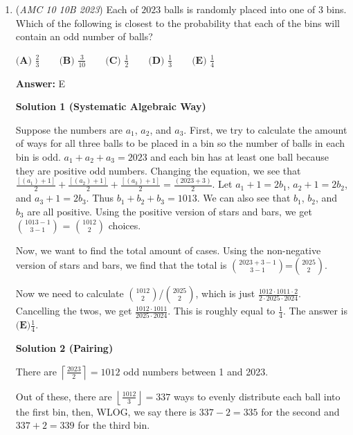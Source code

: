 \begin{enumerate}
 The length of a semicircle of radius $r$ is $\pi r$. Thus, the total length of the four congruent semicircles is
 \[L=4\pi r=4\pi\sqrt{2} =\pi\sqrt{32}.\]

 Comparing with $L=\pi\sqrt{n}$, we obtain
 \[\boxed{\textbf{(A)}\ 32}.\]



	\item (\textit{AMC 10 10B 2023}) Each of $2023$ balls is randomly placed into one of $3$ bins. Which of the following is closest to the probability that each of the bins will contain an odd number of balls?


 $\textbf{(A) } \frac{2}{3} \qquad \textbf{(B) } \frac{3}{10} \qquad \textbf{(C) } \frac{1}{2} \qquad \textbf{(D) } \frac{1}{3} \qquad \textbf{(E) } \frac{1}{4}$

 \textbf{Answer: }E



\textbf{Solution 1 (Systematic Algebraic Way)}

Suppose the numbers are $a_1$, $a_2$, and $a_3$. First, we try to calculate the amount of ways for all three balls to be placed in a bin so the number of balls in each bin is odd. $a_1+a_2+a_3=2023$ and each bin has at least one ball because they are positive odd numbers. Changing the equation, we see that $\frac{[(a_1)+1]}{2}+\frac{[(a_2)+1]}{2}+\frac{[(a_3)+1]}{2}=\frac{(2023+3)}{2}$. Let $a_1+1=2b_1$, $a_2+1=2b_2$, and $a_3+1=2b_3$. Thus $b_1+b_2+b_3=1013$. We can also see that $b_1$, $b_2$, and $b_3$ are all positive. Using the positive version of stars and bars, we get ${1013-1 \choose 3-1}$ = ${1012 \choose 2}$ choices. 

 Now, we want to find the total amount of cases. Using the non-negative version of stars and bars, we find that the total is ${2023+3-1 \choose 3-1}$=${2025 \choose 2}$. 

 Now we need to calculate ${1012 \choose 2}$/${2025 \choose 2}$, which is just $\frac{1012 \cdot 1011 \cdot 2}{2 \cdot 2025 \cdot 2024}$. Cancelling the twos, we get $\frac{1012 \cdot 1011}{2025 \cdot 2024}$. This is roughly equal to $\frac{1}{4}$. The answer is $\boxed{\textbf{(E)} \frac{1}{4}}$.

 



\textbf{Solution 2 (Pairing)}

There are \( \left\lceil\frac{2023}{2}\right\rceil = 1012 \) odd numbers between 1 and 2023.

 Out of these, there are \( \left\lfloor\frac{1012}{3}\right\rfloor = 337 \) ways to evenly distribute each ball into the first bin, then, WLOG, we say there is \( 337 - 2 = 335 \) for the second and \( 337 + 2 = 339 \) for the third bin.


\end{enumerate}
